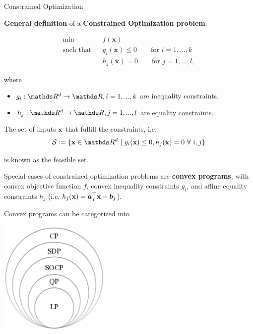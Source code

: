 \documentclass[11pt,compress,t,notes=noshow, xcolor=table]{beamer}
\begin{document}
\begin{vbframe}{Constrained Optimization}

\textbf{General definition} of a \textbf{Constrained Optimization problem}:

\begin{eqnarray*}
\min && f(\mathbf{x})  \\
\text{such that} && g_i(\mathbf{x}) \le 0 \qquad \text{for } i=1,\ldots,k  \\
 && h_j(\mathbf{x}) = 0 \qquad \text{for } j=1,\ldots,l,
\end{eqnarray*}

\vspace*{-0.5cm}

where

\begin{itemize}
\item $g_i: \R^d \to \R, i = 1, ..., k$ are inequality constraints,
\item $h_j: \R^d \to \R, j = 1, ..., l$ are equality constraints.
\end{itemize}

\lz 

The set of inputs $\mathbf{x}$ that fulfill the constraints, i.e.  
$$\mathcal{S}:= \{\xv \in \R^d ~|~ g_i(\xv) \le 0, h_j(\xv) = 0 ~\forall~ i, j\}
$$ 

is known as the feasible set.

\framebreak

Special cases of constrained optimization problems are \textbf{convex programs}, with convex objective function $f$, convex inequality constraints $g_i$, and affine equality constraints $h_j$ (i.e. $h_j(\mathbf{x}) = \bm{a}_j^\top \mathbf{x} - \bm{b}_j$). 

\lz 

Convex programs can be categorized into 

\begin{center}
\includegraphics[width=0.4\textwidth]{figure_man/convex_programs.png}
\end{center}


\end{vbframe}
\end{document}
